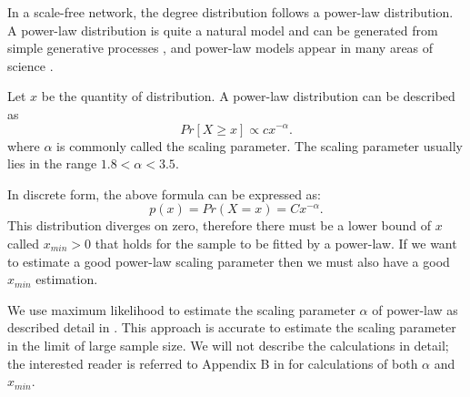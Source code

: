 \documentclass[10pt,conference,letterpaper]{IEEEtran}
\begin{document}
In a scale-free network, the degree distribution follows a power-law distribution.   
A power-law distribution is quite a natural model and can be generated from simple generative processes \cite{mitzenmacher2004brief}, and power-law models appear in many areas of science \cite{clauset2009power} \cite{mitzenmacher2004brief}. 

Let $x$ be the quantity of distribution. 
A power-law distribution can be described as
\begin{equation}
Pr[X\ge x] \propto cx^{-\alpha}.
\label{eq:powerlaw}
\end{equation}
where $\alpha$ is commonly called the scaling parameter. 
The scaling parameter usually lies in the range $1.8<\alpha<3.5$.

In discrete form, the above formula can be expressed as:
\begin{equation}
p(x) = Pr(X=x) = Cx^{- \alpha}.
\label{eq:powerlawdiscrete}
\end{equation}
This distribution diverges on zero, therefore there must be a lower bound of $x$ called $x_{min} > 0$ that holds for the sample to be fitted by a power-law. 
If we want to estimate a good power-law scaling parameter then we must also have a good $x_{min}$ estimation. 


We use maximum likelihood to estimate the scaling parameter $\alpha$ of power-law as described detail in \cite{clauset2009power}.  
This approach is accurate to estimate the scaling parameter in the limit of large sample size.  
We will not describe the calculations in detail; the interested reader is referred to Appendix B in \cite{clauset2009power} for calculations of both $\alpha$ and $x_{min}$.
\end{document}
